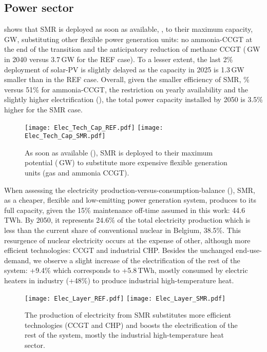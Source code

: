 \subsection{Power sector}
\label{subsec:atom_mol:results_deter_power_sector}
 shows that \gls{SMR} is deployed as soon as available, , to their maximum capacity, \,GW, substituting other flexible power generation units: no ammonia-\gls{CCGT} at the end of the transition and the anticipatory reduction of methane \gls{CCGT} (\,GW in 2040 versus 3.7\,GW for the REF case). To a lesser extent, the last 2\% deployment of solar-\gls{PV} is slightly delayed as the capacity in 2025 is 1.3\,GW smaller than in the REF case. Overall, given the smaller efficiency of \gls{SMR}, \% versus 51\% for ammonia-\gls{CCGT}, the restriction on yearly availability and the slightly higher electrification (), the total power capacity installed by 2050 is 3.5\% higher for the SMR case.\\

\begin{figure}[htbp!]
\centering
\texttt{[image: Elec\_Tech\_Cap\_REF.pdf]}
\texttt{[image: Elec\_Tech\_Cap\_SMR.pdf]}
\caption{As soon as available (), \acrfull{SMR} is deployed to their maximum potential (\,GW) to substitute more expensive flexible generation units (\ie gas and ammonia \gls{CCGT}).}
\label{fig:results_deter_tech_cap_elec}
\end{figure}

When assessing the electricity production-versus-consumption-balance (), \gls{SMR}, as a cheaper, flexible and low-emitting power generation system, produces to its full capacity, given the 15\% maintenance off-time assumed in this work: 44.6\,TWh. By 2050, it represents 24.6\% of the total electricity production which is less than the current share of conventional nuclear in Belgium, 38.5\%. This resurgence of nuclear electricity occurs at the expense of other, although more efficient technologies: \gls{CCGT} and industrial \gls{CHP}. Besides the unchanged end-use-demand, we observe a slight increase of the electrification of the rest of the system: +9.4\% which corresponds to +5.8\,TWh, mostly consumed by electric heaters in industry (+48\%) to produce industrial high-temperature heat.

\begin{figure}[htbp!]
\centering
\texttt{[image: Elec\_Layer\_REF.pdf]}
\texttt{[image: Elec\_Layer\_SMR.pdf]}
\caption{The production of electricity from \gls{SMR} substitutes more efficient technologies (\ie \gls{CCGT} and \gls{CHP}) and boosts the electrification of the rest of the system, mostly the industrial high-temperature heat sector.}
\label{fig:results_deter_layer_elec}
\end{figure}


